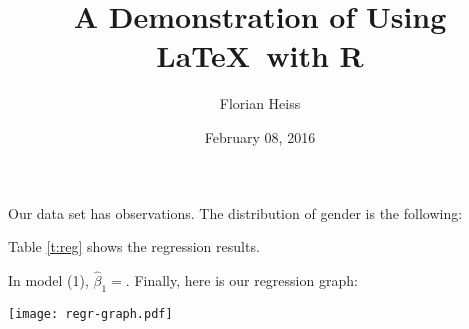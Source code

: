 \documentclass[fontsize=12pt,DIV=30]{scrartcl}
\begin{document}
\title{A Demonstration of Using \LaTeX\ with R}
\author{Florian Heiss}
\date{February 08, 2016}
\maketitle
\thispagestyle{empty}

Our data set has  observations. 
The distribution of gender is the following:


Table \ref{t:reg} shows the regression results.


In model (1), $\hat\beta_1=$. 
Finally, here is our regression graph:

\centering\texttt{[image: regr-graph.pdf]}
\end{document}

